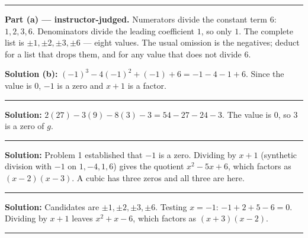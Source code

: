 \documentclass[12pt]{article}
\begin{document}



\vspace{0.3cm}
\noindent\rule{\linewidth}{0.4pt}
\vspace{0.2cm}


\textbf{Part (a) --- instructor-judged.} Numerators divide the constant term
$6$: $1, 2, 3, 6$. Denominators divide the leading coefficient $1$, so only $1$.
The complete list is $\pm 1, \pm 2, \pm 3, \pm 6$ --- eight values. The usual
omission is the negatives; deduct for a list that drops them, and for any value
that does not divide $6$.

\textbf{Solution (b):} $(-1)^{3} - 4(-1)^{2} + (-1) + 6 = -1 - 4 - 1 + 6$.
Since the value is $0$, $-1$ is a zero and $x + 1$ is a factor. 

\vspace{0.15cm}
\noindent\rule{\linewidth}{0.2pt}


\textbf{Solution:} $2(27) - 3(9) - 8(3) - 3 = 54 - 27 - 24 - 3$. The value is
$0$, so $3$ is a zero of $g$. 

\vspace{0.15cm}
\noindent\rule{\linewidth}{0.2pt}


\textbf{Solution:} Problem 1 established that $-1$ is a zero. Dividing by
$x + 1$ (synthetic division with $-1$ on $1, -4, 1, 6$) gives the quotient
$x^{2} - 5x + 6$, which factors as $(x - 2)(x - 3)$. A cubic has three zeros and
all three are here. 

\vspace{0.15cm}
\noindent\rule{\linewidth}{0.2pt}


\textbf{Solution:} Candidates are $\pm 1, \pm 2, \pm 3, \pm 6$. Testing
$x = -1$: $-1 + 2 + 5 - 6 = 0$. Dividing by $x + 1$ leaves $x^{2} + x - 6$,
which factors as $(x + 3)(x - 2)$. 

\vspace{0.15cm}
\noindent\rule{\linewidth}{0.2pt}
\end{document}

